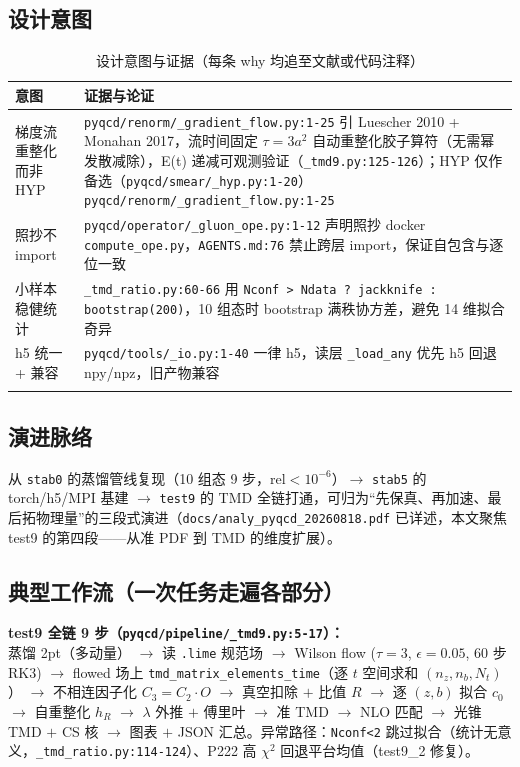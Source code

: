 \documentclass[UTF8]{ctexart}
\begin{document}
\subsection{设计意图}
\small
\begin{xltabular}{\textwidth}{lX}
\toprule
意图 & 证据与论证 \\
\midrule
\endhead
梯度流重整化而非 HYP & \texttt{\nolinkurl{pyqcd/renorm/\_gradient\_flow.py:1-25}} 引 Luescher 2010 + Monahan 2017，流时间固定 $\tau=3a^2$ 自动重整化胶子算符（无需幂发散减除），E(t) 递减可观测验证（\texttt{\nolinkurl{\_tmd9.py:125-126}}）；HYP 仅作备选（\texttt{\nolinkurl{pyqcd/smear/\_hyp.py:1-20}}）\textcolor{evidence}{\texttt{\nolinkurl{pyqcd/renorm/\_gradient\_flow.py:1-25}}} \\
照抄不 import & \texttt{\nolinkurl{pyqcd/operator/\_gluon\_ope.py:1-12}} 声明照抄 docker \texttt{\nolinkurl{compute\_ope.py}}，\texttt{\nolinkurl{AGENTS.md:76}} 禁止跨层 import，保证自包含与逐位一致 \\
小样本稳健统计 & \texttt{\nolinkurl{\_tmd\_ratio.py:60-66}} 用 \texttt{\nolinkurl{Nconf > Ndata ? jackknife : bootstrap(200)}}，10 组态时 bootstrap 满秩协方差，避免 14 维拟合奇异 \\
h5 统一 + 兼容 & \texttt{\nolinkurl{pyqcd/tools/\_io.py:1-40}} 一律 h5，读层 \texttt{\nolinkurl{\_load\_any}} 优先 h5 回退 npy/npz，旧产物兼容 \\
\bottomrule
\caption{设计意图与证据（每条 why 均追至文献或代码注释）}
\end{xltabular}

\subsection{演进脉络}
从 \texttt{\nolinkurl{stab0}} 的蒸馏管线复现（10 组态 9 步，rel$<10^{-6}$）$\rightarrow$ \texttt{\nolinkurl{stab5}} 的 torch/h5/MPI 基建 $\rightarrow$ \texttt{\nolinkurl{test9}} 的 TMD 全链打通，可归为“先保真、再加速、最后拓物理量”的三段式演进（\texttt{\nolinkurl{docs/analy\_pyqcd\_20260818.pdf}} 已详述，本文聚焦 test9 的第四段——从准 PDF 到 TMD 的维度扩展）。

\subsection{典型工作流（一次任务走遍各部分）}
\begin{ideabox}
\textbf{test9 全链 9 步（\texttt{\nolinkurl{pyqcd/pipeline/\_tmd9.py:5-17}}）：}\\
蒸馏 2pt（多动量） $\rightarrow$ 读 \texttt{\nolinkurl{.lime}} 规范场 $\rightarrow$ Wilson flow ($\tau=3$, $\epsilon=0.05$, 60 步 RK3) $\rightarrow$ flowed 场上 \texttt{\nolinkurl{tmd\_matrix\_elements\_time}}（逐 $t$ 空间求和 $(n_z,n_b,N_t)$） $\rightarrow$ 不相连因子化 $C_3=C_2\cdot O$ $\rightarrow$ 真空扣除 $+$ 比值 $R$ $\rightarrow$ 逐 $(z,b)$ 拟合 $c_0$ $\rightarrow$ 自重整化 $h_R$ $\rightarrow$ $\lambda$ 外推 $+$ 傅里叶 $\rightarrow$ 准 TMD $\rightarrow$ NLO 匹配 $\rightarrow$ 光锥 TMD $+$ CS 核 $\rightarrow$ 图表 $+$ JSON 汇总。异常路径：\texttt{\nolinkurl{Nconf<2}} 跳过拟合（统计无意义，\texttt{\nolinkurl{\_tmd\_ratio.py:114-124}}）、P222 高 $\chi^2$ 回退平台均值（test9\_2 修复）。
\end{ideabox}
\end{document}
